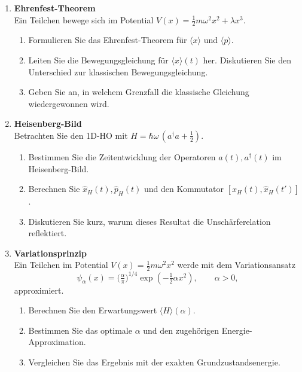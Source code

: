 \documentclass[11pt,a4paper]{article}
\begin{document}
\begin{enumerate}

\item \textbf{Ehrenfest-Theorem}\\
Ein Teilchen bewege sich im Potential \(V(x)=\tfrac12 m \omega^2 x^2+\lambda x^3\).
\begin{enumerate}
  \item Formulieren Sie das Ehrenfest-Theorem für \(\langle x\rangle\) und \(\langle p\rangle\).
  \item Leiten Sie die Bewegungsgleichung für \(\langle x\rangle(t)\) her. Diskutieren Sie den Unterschied zur klassischen Bewegungsgleichung.
  \item Geben Sie an, in welchem Grenzfall die klassische Gleichung wiedergewonnen wird.
\end{enumerate}

\item \textbf{Heisenberg-Bild}\\
Betrachten Sie den 1D-HO mit \(H=\hbar\omega\,(a^\dagger a+\tfrac12)\).
\begin{enumerate}
  \item Bestimmen Sie die Zeitentwicklung der Operatoren \(a(t),a^\dagger(t)\) im Heisenberg-Bild.
  \item Berechnen Sie \(\hat x_H(t), \hat p_H(t)\) und den Kommutator \([\hat x_H(t),\hat x_H(t')]\).
  \item Diskutieren Sie kurz, warum dieses Resultat die Unschärferelation reflektiert.
\end{enumerate}

\item \textbf{Variationsprinzip}\\
Ein Teilchen im Potential \(V(x)=\tfrac12 m \omega^2 x^2\) werde mit dem Variationsansatz
\[
\psi_\alpha(x)=\bigl(\tfrac{\alpha}{\pi}\bigr)^{1/4}\exp\!\left(-\tfrac12\alpha x^2\right),\qquad \alpha>0,
\]
approximiert.
\begin{enumerate}
  \item Berechnen Sie den Erwartungswert \(\langle H\rangle(\alpha)\).
  \item Bestimmen Sie das optimale \(\alpha\) und den zugehörigen Energie-Approximation.
  \item Vergleichen Sie das Ergebnis mit der exakten Grundzustandsenergie.
\end{enumerate}


\end{enumerate}
\end{document}
